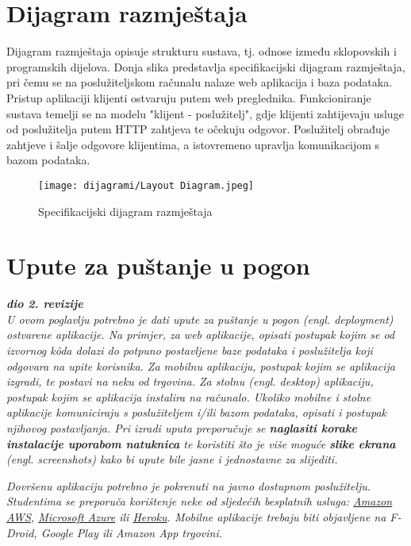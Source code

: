 			\eject 
		
		
		\section{Dijagram razmještaja}
			
			Dijagram razmještaja opisuje strukturu sustava, tj. odnose između sklopovskih i programskih dijelova. Donja slika predstavlja specifikacijski dijagram razmještaja, pri čemu se na poslužiteljskom računalu nalaze web aplikacija i baza podataka. Pristup aplikaciji klijenti ostvaruju putem web preglednika. Funkcioniranje sustava temelji se na modelu "klijent - poslužitelj", gdje klijenti zahtijevaju usluge od poslužitelja putem HTTP zahtjeva te očekuju odgovor. Poslužitelj obrađuje zahtjeve i šalje odgovore klijentima, a istovremeno upravlja komunikacijom s bazom podataka.

            \begin{figure}[H]
			         \texttt{[image: dijagrami/Layout Diagram.jpeg]}
			         \centering
			         \caption{Specifikacijski dijagram razmještaja}
			         \label{fig:LayoutDiagram}
		    \end{figure}
			
			\eject 
		
		\section{Upute za puštanje u pogon}
		
			\textbf{\textit{dio 2. revizije}}\\
		
			 \textit{U ovom poglavlju potrebno je dati upute za puštanje u pogon (engl. deployment) ostvarene aplikacije. Na primjer, za web aplikacije, opisati postupak kojim se od izvornog kôda dolazi do potpuno postavljene baze podataka i poslužitelja koji odgovara na upite korisnika. Za mobilnu aplikaciju, postupak kojim se aplikacija izgradi, te postavi na neku od trgovina. Za stolnu (engl. desktop) aplikaciju, postupak kojim se aplikacija instalira na računalo. Ukoliko mobilne i stolne aplikacije komuniciraju s poslužiteljem i/ili bazom podataka, opisati i postupak njihovog postavljanja. Pri izradi uputa preporučuje se \textbf{naglasiti korake instalacije uporabom natuknica} te koristiti što je više moguće \textbf{slike ekrana} (engl. screenshots) kako bi upute bile jasne i jednostavne za slijediti.}
			
			
			 \textit{Dovršenu aplikaciju potrebno je pokrenuti na javno dostupnom poslužitelju. Studentima se preporuča korištenje neke od sljedećih besplatnih usluga: \href{https://aws.amazon.com/}{Amazon AWS}, \href{https://azure.microsoft.com/en-us/}{Microsoft Azure} ili \href{https://www.heroku.com/}{Heroku}. Mobilne aplikacije trebaju biti objavljene na F-Droid, Google Play ili Amazon App trgovini.}
			
			
			\eject 